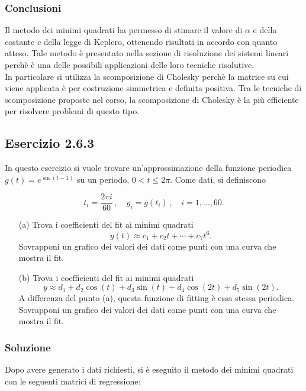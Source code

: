 \documentclass[letterpaper, 12pt]{article}
\numberwithin{equation}{section}    %
\begin{document}
\subsubsection{Conclusioni}
Il metodo dei minimi quadrati ha permesso di stimare il valore di $\alpha$ e della costante $c$
della legge di Keplero, ottenendo risultati in accordo con quanto atteso. Tale metodo è presentato nella
sezione di risoluzione dei sistemi lineari perchè è una delle possibili applicazioni delle loro 
tecniche risolutive. \\
In particolare si utilizza la scomposizione di Cholesky perchè la matrice su cui viene applicata è per 
costruzione simmetrica e definita positiva. Tra le tecniche di scomposizione proposte nel corso, la 
scomposizione di Cholesky è la più efficiente per risolvere problemi di questo tipo. 

\subsection{Esercizio 2.6.3}
In questo esercizio si vuole trovare un'approssimazione della funzione periodica $g(t)=e^{\sin(t-1)}$ su un 
periodo, $0 < t \le 2\pi$. Come dati, si definiscono

\begin{equation*}
    t_i = \frac{2\pi i}{60}\,,
    \quad  
    y_i = g(t_i)\,,
    \quad i=1,\ldots,60.
\end{equation*}

\begin{enumerate}
\item [(a)] Trova i coefficienti del fit ai minimi quadrati    
    \begin{equation}
        \label{eq:fit_pol}    
        y(t) \approx c_1 + c_2 t + \cdots + c_7 t^6.
    \end{equation}        
Sovrapponi un grafico dei valori dei dati come punti con una curva che mostra il fit. 
\item[(b)] Trova i coefficienti del fit ai minimi quadrati
    \begin{equation}
    \label{eq:fit_fourier}
        y \approx d_1 + d_2\cos(t) + d_3\sin(t) + d_4\cos(2t) + d_5\sin(2t).
    \end{equation}
A differenza del punto (a), questa funzione di fitting è essa stessa periodica. 
Sovrapponi un grafico dei valori dei dati come punti con una curva che mostra il fit.
\end{enumerate}

\subsubsection{Soluzione}
Dopo avere generato i dati richiesti, si è eseguito il metodo dei minimi quadrati con le seguenti 
matrici di regressione:
\end{document}
